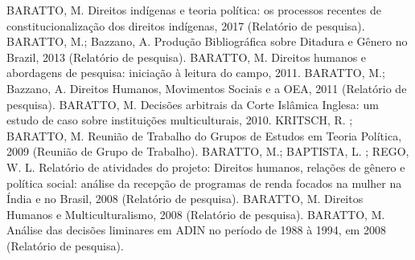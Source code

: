 
\begin{cvcitems}
  \cvcitem
    {BARATTO, M.}
    {Direitos indígenas e teoria política: os processos recentes de constitucionalização dos direitos indígenas, 2017 (Relatório de pesquisa).}
  \cvcitem
    {BARATTO, M.; Bazzano, A.}
    {Produção Bibliográfica sobre Ditadura e Gênero no Brazil, 2013 (Relatório de pesquisa).}
  \cvcitem
    {BARATTO, M.}
    {Direitos humanos e abordagens de pesquisa: iniciação à leitura do campo, 2011.}
  \cvcitem
    {BARATTO, M.; Bazzano, A.}
    {Direitos Humanos, Movimentos Sociais e a OEA, 2011 (Relatório de pesquisa).}
  \cvcitem
    {BARATTO, M.}
    {Decisões arbitrais da Corte Islâmica Inglesa: um estudo de caso sobre instituições multiculturais, 2010.}
  \cvcitem
    {KRITSCH, R. ; BARATTO, M.}
    {Reunião de Trabalho do Grupos de Estudos em Teoria Política, 2009 (Reunião de Grupo de Trabalho).}
  \cvcitem
    {BARATTO, M.; BAPTISTA, L. ; REGO, W. L.}
    {Relatório de atividades do projeto: Direitos humanos, relações de gênero e política social: análise da recepção de programas de renda focados na mulher na Índia e no Brasil, 2008 (Relatório de pesquisa).}
  \cvcitem
    {BARATTO, M.}
    {Direitos Humanos e Multiculturalismo, 2008 (Relatório de pesquisa).}
  \cvcitem
    {BARATTO, M.}
    {Análise das decisões liminares em ADIN no período de 1988 à 1994, em 2008 (Relatório de pesquisa).}
\end{cvcitems}

%
